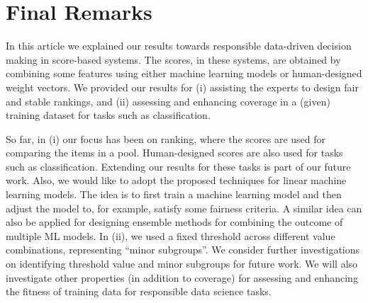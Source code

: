 \documentclass[11pt]{article}
\begin{document}



\vspace{-3mm}\section{Final Remarks}\label{sec:conclusion2}
In this article we explained our results towards responsible data-driven decision making in score-based systems.
The scores, in these systems, are obtained by combining some features using either machine learning models or human-designed weight vectors.
We provided our results for (i) assisting the experts to design fair and stable rankings, and (ii) assessing and enhancing coverage in a (given) training dataset for tasks such as classification.

So far, in (i) our focus has been on ranking, where the scores are used for comparing the items in a pool. Human-designed scores are also used for tasks such as classification.
Extending our results for these tasks is part of our future work.
Also, we would like to adopt the proposed techniques for linear machine learning models.
The idea is to first train a machine learning model and then adjust the model to, for example, satisfy some fairness criteria. A similar idea can also be applied for designing ensemble methods for combining the outcome of multiple ML models.
In (ii), we used a fixed threshold across different value combinations, representing ``minor subgroups''.
We consider further investigations on identifying threshold value and minor subgroups for future work.
We will also investigate other properties (in addition to coverage) for assessing and enhancing the fitness of training data for responsible data science tasks.




% 
% 
\end{document}
